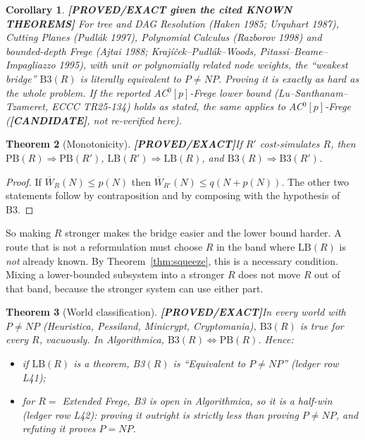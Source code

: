 \documentclass[11pt]{article}
\newtheorem{theorem}{Theorem}
\newtheorem{corollary}[theorem]{Corollary}
\theoremstyle{definition}
\theoremstyle{remark}
\newcommand{\Wb}{\overline W}
\newcommand{\status}[1]{\textbf{[#1]}}
\begin{document}
\begin{corollary}\status{PROVED/EXACT given the cited KNOWN THEOREMS}
For tree and DAG Resolution (Haken 1985; Urquhart 1987), Cutting Planes (Pudl\'ak 1997),
Polynomial Calculus (Razborov 1998) and bounded-depth Frege (Ajtai 1988; Kraj\'i\v{c}ek--Pudl\'ak--Woods,
Pitassi--Beame--Impagliazzo 1995), with unit or polynomially related node weights, the
``weakest bridge'' $\mathrm{B3}(R)$ is \emph{literally equivalent to} $P\ne NP$.
Proving it is exactly as hard as the whole problem.
If the reported AC$^0[p]$-Frege lower bound (Lu--Santhanam--Tzameret, ECCC TR25-134) holds as
stated, the same applies to AC$^0[p]$-Frege (\status{CANDIDATE}, not re-verified here).
\end{corollary}

\begin{theorem}[Monotonicity]\status{PROVED/EXACT}\label{thm:mono}
If $R'$ cost-simulates $R$, then $\mathrm{PB}(R)\Rightarrow\mathrm{PB}(R')$,
$\mathrm{LB}(R')\Rightarrow\mathrm{LB}(R)$, and $\mathrm{B3}(R)\Rightarrow\mathrm{B3}(R')$.
\end{theorem}
\begin{proof}
If $\Wb_R(N)\le p(N)$ then $\Wb_{R'}(N)\le q(N+p(N))$. The other two statements follow by
contraposition and by composing with the hypothesis of B3.
\end{proof}

So making $R$ stronger makes the bridge easier and the lower bound harder. A route that is not a
reformulation must choose $R$ in the band where $\mathrm{LB}(R)$ is \emph{not} already known. By
Theorem~\ref{thm:squeeze}, this is a necessary condition. Mixing a lower-bounded subsystem into a
stronger $R$ does not move $R$ out of that band, because the stronger system can use either part.

\begin{theorem}[World classification]\status{PROVED/EXACT}\label{thm:worlds}
In every world with $P\ne NP$ (Heuristica, Pessiland, Minicrypt, Cryptomania), $\mathrm{B3}(R)$ is
true for every $R$, vacuously. In Algorithmica, $\mathrm{B3}(R)\iff\mathrm{PB}(R)$. Hence:
\begin{itemize}
\item if $\mathrm{LB}(R)$ is a theorem, B3$(R)$ is ``Equivalent to $P\ne NP$'' (ledger row L41);
\item for $R=$ Extended Frege, B3 is open in Algorithmica, so it is a \emph{half-win}
(ledger row L42): proving it outright is strictly less than proving $P\ne NP$, and refuting it
proves $P=NP$.
\end{itemize}
\end{theorem}
\end{document}
